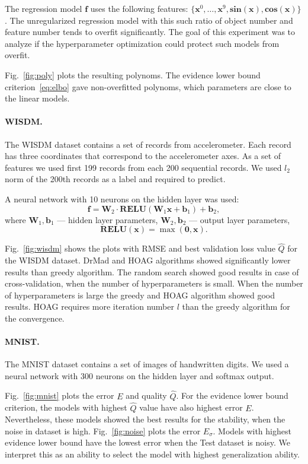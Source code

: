 \documentclass[smallextended]{svjour3}
\begin{document}
The regression model $\mathbf{f}$ uses the following features: $\{\mathbf{x}^0, \dots, \mathbf{x}^9, \textbf{sin}(\mathbf{x}), \textbf{cos}(\mathbf{x})\}$. The unregularized regression model with this such ratio of  object number and feature number tends to overfit significantly. The goal of this experiment was to analyze if the hyperparameter optimization could protect such models from overfit.

Fig.~\ref{fig:poly} plots the resulting polynoms. 
The evidence lower bound criterion~\eqref{eq:elbo} gave non-overfitted polynoms, which parameters are close to the linear models.

\paragraph{WISDM.}
The WISDM dataset contains a set of records from accelerometer. Each record has three coordinates that correspond to the accelerometer axes. As a set of features we used first 199  records from each 200 sequential records. We used $l_2$ norm of the 200th records as a label and required to predict. 

A neural network with 10 neurons on the hidden layer was used:
\[
    \mathbf{f} = \mathbf{W}_2 \cdot \textbf{RELU}(\mathbf{W}_1\mathbf{x} + \mathbf{b}_1) +\mathbf{b}_2,
\]
where $\mathbf{W}_1, \mathbf{b}_1$ --- hidden layer parameters,
$\mathbf{W}_2, \mathbf{b}_2$ --- output layer parameters,
\[
    \textbf{RELU}(\mathbf{x}) = \max(\mathbf{0}, \mathbf{x}).
\]

Fig.~\ref{fig:wisdm} shows the plots with RMSE and best validation loss value $\hat{Q}$ for the WISDM dataset.
DrMad and HOAG algorithms showed significantly lower results than greedy algorithm. The random search showed good results in case of cross-validation, when the number of hyperparameters is small. When the number of hyperparameters is large the greedy and HOAG algorithm showed good results. HOAG requires more iteration number $l$ than the greedy algorithm for the convergence.


\paragraph{MNIST.}
The MNIST dataset contains a set of images of handwritten digits. 
We used a neural network with 300 neurons on the hidden layer and softmax output.


Fig.~\ref{fig:mnist} plots the error $E$ and quality $\hat{Q}$.
For the evidence lower bound criterion, the models with highest $\hat{Q}$ value have also highest error $E$. Nevertheless, 
these models showed the best results for the stability, when the noise in dataset is high. Fig.~\ref{fig:noise} plots  the error $E_\sigma$. Models with highest evidence lower bound have the lowest error when the Test dataset is noisy. We interpret this as an ability to select the model with highest generalization ability.
\end{document}
